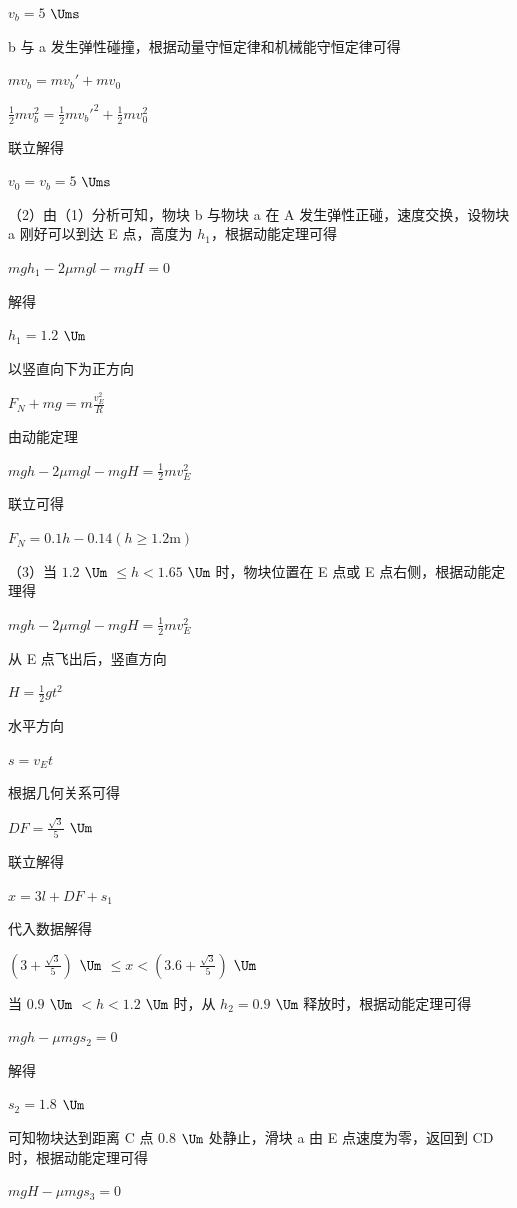 \documentclass[\gkver]{gaokaozhenti}
\begin{document}
\begin{enumerate}
{	$v_{b}=5$ $\Ums$

	b 与 a 发生弹性碰撞，根据动量守恒定律和机械能守恒定律可得

	$mv_{b}=mv_{b}'+mv_{0}$

	$\frac{1}{2}mv_{b}^{2}=\frac{1}{2}mv_{b}'^{2}+\frac{1}{2}mv_{0}^{2}$

	联立解得

	$v_{0}=v_{b}=5$ $\Ums$

	（2）由（1）分析可知，物块 b 与物块 a 在 A 发生弹性正碰，速度交换，设物块 a 刚好可以到达 E 点，高度为 $h_{1}$，根据动能定理可得

	$mgh_{1}-2\mu mgl-mgH=0$

	解得

	$h_{1}=1.2$ $\Um$

	以竖直向下为正方向

	$F_{N} + mg = m \frac{v_{E}^{2}}{R}$

	由动能定理

	$mgh - 2\mu mgl - mgH = \frac{1}{2}mv_{E}^{2}$

	联立可得

	$F_{N}=0.1h-0.14(h\geqslant1.2\mathrm{m})$

	（3）当 $1.2$ $\Um$ $\leqslant h < 1.65$ $\Um$ 时，物块位置在 E 点或 E 点右侧，根据动能定理得

	$mgh - 2\mu mgl - mgH = \frac{1}{2}mv_{E}^{2}$

	从 E 点飞出后，竖直方向

	$H = \frac{1}{2}gt^{2}$

	水平方向

	$s = v_{E}t$

	根据几何关系可得

	$DF = \frac{\sqrt{3}}{5}$ $\Um$

	联立解得

	$x = 3l + DF + s_{1}$

	代入数据解得

	$\left(3 + \frac{\sqrt{3}}{5}\right)$ $\Um$ $\leqslant x < \left(3.6 + \frac{\sqrt{3}}{5}\right)$ $\Um$

	当 $0.9$ $\Um$ $< h < 1.2$ $\Um$ 时，从 $h_{2} = 0.9$ $\Um$ 释放时，根据动能定理可得

	$mgh - \mu mgs_{2} = 0$

	解得

	$s_{2} = 1.8$ $\Um$

	可知物块达到距离 C 点 $0.8$ $\Um$ 处静止，滑块 a 由 E 点速度为零，返回到 CD 时，根据动能定理可得

	$mgH - \mu mgs_{3} = 0$

}
\end{enumerate}
\end{document}
